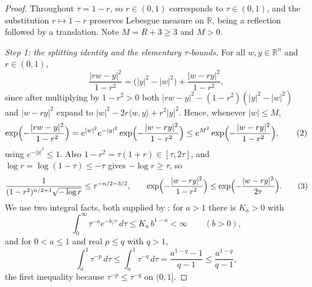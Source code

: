 \begin{proof}
Throughout $\tau = 1-r$, so $r \in (0,1)$ corresponds to $\tau \in (0,1)$, and the
substitution $r \mapsto 1-r$ preserves Lebesgue measure on $\mathbb{R}$, being a
reflection followed by a translation.  Note $M = R+3 \geq 3$ and $M > 0$.

\emph{Step 1: the splitting identity and the elementary $\tau$-bounds.}
For all $w,y \in \mathbb{R}^n$ and $r \in (0,1)$,
\begin{equation*}
  \frac{|rw-y|^2}{1-r^2} = \bigl(|y|^2-|w|^2\bigr) + \frac{|w-ry|^2}{1-r^2} ,
  \tag{1}
\end{equation*}
since after multiplying by $1-r^2 > 0$ both
$|rw-y|^2 - (1-r^2)(|y|^2-|w|^2)$ and $|w-ry|^2$ expand to
$|w|^2 - 2r\langle w,y\rangle + r^2|y|^2$.  Hence, whenever $|w| \leq M$,
\begin{equation*}
  \exp\Bigl(-\frac{|rw-y|^2}{1-r^2}\Bigr)
    = e^{|w|^2}e^{-|y|^2}\exp\Bigl(-\frac{|w-ry|^2}{1-r^2}\Bigr)
    \leq e^{M^2}\exp\Bigl(-\frac{|w-ry|^2}{1-r^2}\Bigr) , \tag{2}
\end{equation*}
using $e^{-|y|^2} \leq 1$.  Also $1-r^2 = \tau(1+r) \in [\tau,2\tau]$, and
$\log r = \log(1-\tau) \leq -\tau$ gives $-\log r \geq \tau$, so
\begin{equation*}
  \frac{1}{(1-r^2)^{n/2+1}\sqrt{-\log r}} \leq \tau^{-n/2-3/2} ,
  \qquad
  \exp\Bigl(-\frac{|w-ry|^2}{1-r^2}\Bigr)
    \leq \exp\Bigl(-\frac{|w-ry|^2}{2\tau}\Bigr) . \tag{3}
\end{equation*}
We use two integral facts, both supplied by : for
$a > 1$ there is $K_a > 0$ with
\begin{equation*}
  \int_0^\infty \tau^{-a}e^{-b/\tau}\,d\tau \leq K_a\,b^{1-a} < \infty
  \qquad (b > 0) , \tag{4}
\end{equation*}
and for $0 < a \leq 1$ and real $p \leq q$ with $q > 1$,
\begin{equation*}
  \int_a^1\tau^{-p}\,d\tau \leq \int_a^1\tau^{-q}\,d\tau
    = \frac{a^{1-q}-1}{q-1} \leq \frac{a^{1-q}}{q-1} , \tag{5}
\end{equation*}
the first inequality because $\tau^{-p} \leq \tau^{-q}$ on $(0,1]$.


\end{proof}
